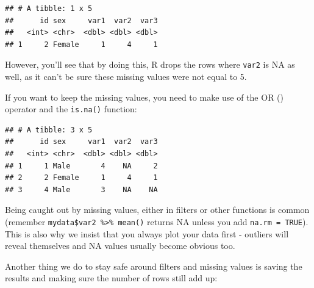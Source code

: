 \documentclass[
  12pt,
  krantz2]{krantz}
\makeatletter
\newenvironment{Shaded}{\begin{snugshade}}{\end{snugshade}}
\newcommand{\DecValTok}[1]{\textcolor[rgb]{0.00,0.00,0.81}{#1}}
\newcommand{\KeywordTok}[1]{\textcolor[rgb]{0.13,0.29,0.53}{\textbf{#1}}}
\newcommand{\NormalTok}[1]{#1}
\newcommand{\OperatorTok}[1]{\textcolor[rgb]{0.81,0.36,0.00}{\textbf{#1}}}
\newcommand{\StringTok}[1]{\textcolor[rgb]{0.31,0.60,0.02}{#1}}
\newenvironment{kframe}{%
\medskip{}
\setlength{\fboxsep}{.8em}
 \def\at@end@of@kframe{}%
 \ifinner\ifhmode%
  \def\at@end@of@kframe{\end{minipage}}%
  \begin{minipage}{\columnwidth}%
 \fi\fi%
 \def\FrameCommand##1{\hskip\@totalleftmargin \hskip-\fboxsep
 \colorbox{shadecolor}{##1}\hskip-\fboxsep
     \hskip-\linewidth \hskip-\@totalleftmargin \hskip\columnwidth}%
 \MakeFramed {\advance\hsize-\width
   \@totalleftmargin\z@ \linewidth\hsize
   \@setminipage}}%
 {\par\unskip\endMakeFramed%
 \at@end@of@kframe}
\renewenvironment{Shaded}{\begin{kframe}}{\end{kframe}}
\makeatother
\begin{document}
\begin{verbatim}
## # A tibble: 1 x 5
##      id sex     var1  var2  var3
##   <int> <chr>  <dbl> <dbl> <dbl>
## 1     2 Female     1     4     1
\end{verbatim}

However, you'll see that by doing this, R drops the rows where \texttt{var2} is NA as well, as it can't be sure these missing values were not equal to 5.

If you want to keep the missing values, you need to make use of the OR (\texttt{\textbar{}}) operator and the \texttt{is.na()} function:

\begin{Shaded}
\end{Shaded}

\begin{verbatim}
## # A tibble: 3 x 5
##      id sex     var1  var2  var3
##   <int> <chr>  <dbl> <dbl> <dbl>
## 1     1 Male       4    NA     2
## 2     2 Female     1     4     1
## 3     4 Male       3    NA    NA
\end{verbatim}

Being caught out by missing values, either in filters or other functions is common (remember \texttt{mydata\$var2\ \%\textgreater{}\%\ mean()} returns NA unless you add \texttt{na.rm\ =\ TRUE}).
This is also why we insist that you always plot your data first - outliers will reveal themselves and NA values usually become obvious too.

Another thing we do to stay safe around filters and missing values is saving the results and making sure the number of rows still add up:

\begin{Shaded}
\end{Shaded}
\end{document}
